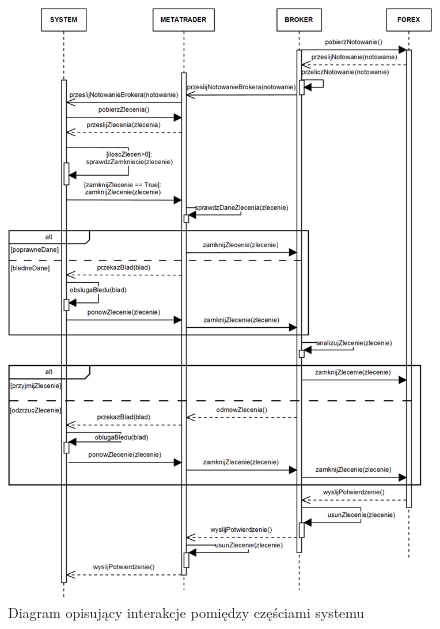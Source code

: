 \documentclass[pdflatex,11pt]{aghdpl}
\begin{document}
\begin{figure}[H]
\begin{center}
\includegraphics[width=16cm]{sekwencji.png}
\caption{Diagram opisujący interakcje pomiędzy częściami systemu}
\label{sekwencji}
\end{center}
\end{figure} 
\end{document}
